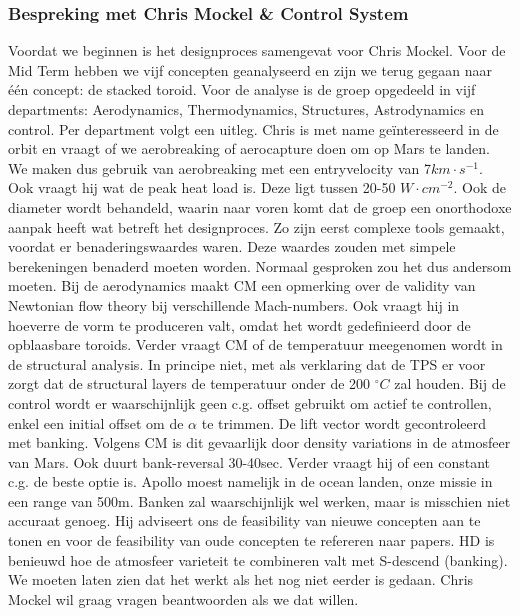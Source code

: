 \subsubsection{Bespreking met Chris Mockel \& Control System}
Voordat we beginnen is het designproces samengevat voor Chris Mockel. Voor de Mid Term hebben we vijf concepten geanalyseerd en zijn we terug gegaan naar \'{e}\'{e}n concept: de stacked toroid. Voor de analyse is de groep opgedeeld in vijf departments: Aerodynamics, Thermodynamics, Structures, Astrodynamics en control. Per department volgt een uitleg. Chris is met name ge\"{i}nteresseerd in de orbit en vraagt of we aerobreaking of aerocapture doen om op Mars te landen. We maken dus gebruik van aerobreaking met een entryvelocity van 7$km\cdot s^{-1}$. Ook vraagt hij wat de peak heat load is. Deze ligt tussen 20-50 $W\cdot cm^{-2}$. Ook de diameter wordt behandeld, waarin naar voren komt dat de groep een onorthodoxe aanpak heeft wat betreft het designproces. Zo zijn eerst complexe tools gemaakt, voordat er benaderingswaardes waren. Deze waardes zouden met simpele berekeningen benaderd moeten worden. Normaal gesproken zou het dus andersom moeten. Bij de aerodynamics maakt CM een opmerking over de validity van Newtonian flow theory bij verschillende Mach-numbers. Ook vraagt hij in hoeverre de vorm te produceren valt, omdat het wordt gedefinieerd door de opblaasbare toroids. Verder vraagt CM of de temperatuur meegenomen wordt in de structural analysis. In principe niet, met als verklaring dat de TPS er voor zorgt dat de structural layers de temperatuur onder de 200 $^{\circ}C$ zal houden.
\newline\newline
Bij de control wordt er waarschijnlijk geen c.g. offset gebruikt om actief te controllen, enkel een initial offset om de $\alpha$ te trimmen. De lift vector wordt gecontroleerd met banking. Volgens CM is dit gevaarlijk door density variations in de atmosfeer van Mars. Ook duurt bank-reversal 30-40sec. Verder vraagt hij of een constant c.g. de beste optie is. Apollo moest namelijk in de ocean landen, onze missie in een range van 500m. Banken zal waarschijnlijk wel werken, maar is misschien niet accuraat genoeg. Hij adviseert ons de feasibility van nieuwe concepten aan te tonen en voor de feasibility van oude concepten te refereren naar papers. HD is benieuwd hoe de atmosfeer varieteit te combineren valt met S-descend (banking). We moeten laten zien dat het werkt als het nog niet eerder is gedaan. Chris Mockel wil graag vragen beantwoorden als we dat willen.
\newline\newline
